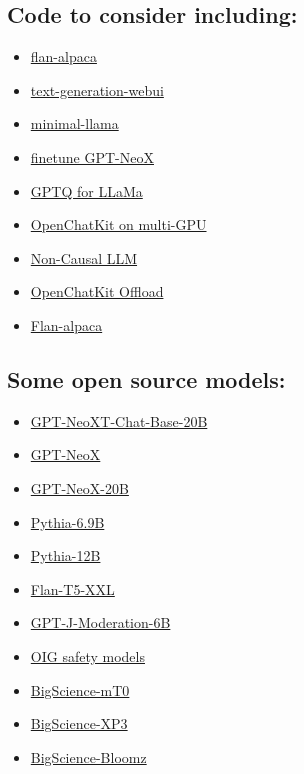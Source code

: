 \documentclass{article}
\begin{document}
\subsection*{Code to consider including:}
\begin{itemize}
    \item \href{https://github.com/declare-lab/flan-alpaca}{flan-alpaca}
    \item \href{https://github.com/oobabooga/text-generation-webui}{text-generation-webui}
    \item \href{https://github.com/zphang/minimal-llama/}{minimal-llama}
    \item \href{https://nn.labml.ai/neox/samples/finetune.html}{finetune GPT-NeoX}
    \item \href{https://github.com/qwopqwop200/GPTQ-for-LLaMa}{GPTQ for LLaMa}
    \item \href{https://github.com/togethercomputer/OpenChatKit/issues/20}{OpenChatKit on multi-GPU}
    \item \href{https://huggingface.co/docs/transformers/main/en/model_doc/gptj#transformers.GPTJForSequenceClassification}{Non-Causal LLM}
    \item \href{https://github.com/togethercomputer/OpenChatKit/commit/148b5745a57a6059231178c41859ecb09164c157}{OpenChatKit Offload}
    \item \href{https://github.com/declare-lab/flan-alpaca/blob/main/training.py}{Flan-alpaca}
\end{itemize}

\subsection*{Some open source models:}
\begin{itemize}
    \item \href{https://huggingface.co/togethercomputer/GPT-NeoXT-Chat-Base-20B/tree/main}{GPT-NeoXT-Chat-Base-20B}
    \item \href{https://huggingface.co/docs/transformers/model_doc/gpt_neox}{GPT-NeoX}
    \item \href{https://huggingface.co/EleutherAI/gpt-neox-20b}{GPT-NeoX-20B}
    \item \href{https://huggingface.co/EleutherAI/pythia-6.9b}{Pythia-6.9B}
    \item \href{https://huggingface.co/EleutherAI/neox-ckpt-pythia-12b}{Pythia-12B}
    \item \href{https://huggingface.co/google/flan-t5-xxl}{Flan-T5-XXL}
    \item \href{https://huggingface.co/togethercomputer/GPT-JT-Moderation-6B}{GPT-J-Moderation-6B}
    \item \href{https://laion.ai/blog/oig-dataset/#safety-models}{OIG safety models}
    \item \href{https://huggingface.co/mT0}{BigScience-mT0}
    \item \href{https://huggingface.co/datasets/bigscience/xP3}{BigScience-XP3}
    \item \href{https://huggingface.co/bigscience/bloomz}{BigScience-Bloomz}
\end{itemize}
\end{document}
